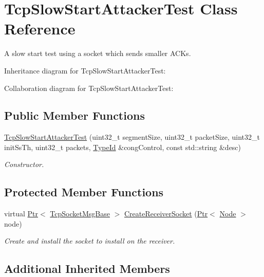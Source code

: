 \hypertarget{classTcpSlowStartAttackerTest}{}\section{Tcp\+Slow\+Start\+Attacker\+Test Class Reference}
\label{classTcpSlowStartAttackerTest}


A slow start test using a socket which sends smaller A\+C\+Ks.  




Inheritance diagram for Tcp\+Slow\+Start\+Attacker\+Test\+:


Collaboration diagram for Tcp\+Slow\+Start\+Attacker\+Test\+:
\subsection*{Public Member Functions}
\begin{DoxyCompactItemize}
\item 
\hyperlink{classTcpSlowStartAttackerTest_ae36db14fe9216d5b7cf28ee84c169052}{Tcp\+Slow\+Start\+Attacker\+Test} (uint32\+\_\+t segment\+Size, uint32\+\_\+t packet\+Size, uint32\+\_\+t init\+Ss\+Th, uint32\+\_\+t packets, \hyperlink{classns3_1_1TypeId}{Type\+Id} \&cong\+Control, const std\+::string \&desc)
\begin{DoxyCompactList}\small\item\em Constructor. \end{DoxyCompactList}\end{DoxyCompactItemize}
\subsection*{Protected Member Functions}
\begin{DoxyCompactItemize}
\item 
virtual \hyperlink{classns3_1_1Ptr}{Ptr}$<$ \hyperlink{classns3_1_1TcpSocketMsgBase}{Tcp\+Socket\+Msg\+Base} $>$ \hyperlink{classTcpSlowStartAttackerTest_aa28e6324b43d534fd907e7b421bb850d}{Create\+Receiver\+Socket} (\hyperlink{classns3_1_1Ptr}{Ptr}$<$ \hyperlink{classns3_1_1Node}{Node} $>$ node)
\begin{DoxyCompactList}\small\item\em Create and install the socket to install on the receiver. \end{DoxyCompactList}\end{DoxyCompactItemize}
\subsection*{Additional Inherited Members}


